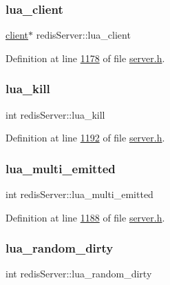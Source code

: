 \subsubsection{\texorpdfstring{lua\+\_\+client}{lua\_client}}
{\footnotesize\ttfamily \hyperlink{structclient}{client}$\ast$ redis\+Server\+::lua\+\_\+client}



Definition at line \hyperlink{server_8h_source_l01178}{1178} of file \hyperlink{server_8h_source}{server.\+h}.

\mbox{\label{structredisServer_a31eced748953fd8209d84a5445a9d131}} 
\subsubsection{\texorpdfstring{lua\+\_\+kill}{lua\_kill}}
{\footnotesize\ttfamily int redis\+Server\+::lua\+\_\+kill}



Definition at line \hyperlink{server_8h_source_l01192}{1192} of file \hyperlink{server_8h_source}{server.\+h}.

\mbox{\label{structredisServer_aaa8aa9d7873718965bd733e297850ccd}} 
\subsubsection{\texorpdfstring{lua\+\_\+multi\+\_\+emitted}{lua\_multi\_emitted}}
{\footnotesize\ttfamily int redis\+Server\+::lua\+\_\+multi\+\_\+emitted}



Definition at line \hyperlink{server_8h_source_l01188}{1188} of file \hyperlink{server_8h_source}{server.\+h}.

\mbox{\label{structredisServer_a51903c05946e86e3d3a48d00f759c800}} 
\subsubsection{\texorpdfstring{lua\+\_\+random\+\_\+dirty}{lua\_random\_dirty}}
{\footnotesize\ttfamily int redis\+Server\+::lua\+\_\+random\+\_\+dirty}



